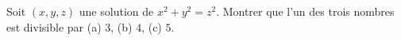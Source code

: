 Soit $(x, y, z)$ une solution de $x^2 + y^2 = z^2$. Montrer que l'un des trois nombres est divisible par (a) $3$, (b) $4$, (c) $5$.
